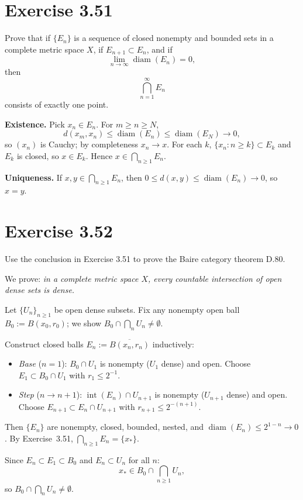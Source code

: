 \documentclass{article}
\begin{document}
\section{Exercise 3.51}

Prove that if $\{E_n\}$ is a sequence of closed nonempty and
bounded sets in a complete metric space $X$, if
$E_{n+1} \subset E_n$, and if
\[
	\lim_{n\to\infty} \operatorname{diam}(E_n)=0,
\]
then
\[
	\bigcap_{n=1}^{\infty} E_n
\]
consists of exactly one point.

\begin{solution}
	\textbf{Existence.}\;
	Pick $x_n\in E_n$.  For $m\ge n\ge N$,
	\[
		d(x_m,x_n)\le\operatorname{diam}(E_n)
		\le\operatorname{diam}(E_N)\to0,
	\]
	so $(x_n)$ is Cauchy; by completeness $x_n\to x$.
	For each $k$, $\{x_n:n\ge k\}\subset E_k$ and $E_k$ is closed,
	so $x\in E_k$.  Hence $x\in\bigcap_{n\ge1}E_n$.

	\medskip

	\textbf{Uniqueness.}\;
	If $x,y\in\bigcap_{n\ge1}E_n$, then
	$0\le d(x,y)\le\operatorname{diam}(E_n)\to0$,
	so $x=y$.\qedhere
\end{solution}

\section{Exercise 3.52}

Use the conclusion in Exercise 3.51 to prove the Baire
category theorem D.80.

\begin{solution}
	We prove: \emph{in a complete metric space $X$, every countable
	intersection of open dense sets is dense.}

	Let $\{U_n\}_{n\ge1}$ be open dense subsets.
	Fix any nonempty open ball $B_0:=B(x_0,r_0)$;
	we show $B_0\cap\bigcap_n U_n\neq\emptyset$.

	Construct closed balls $E_n:=\overline{B(x_n,r_n)}$
	inductively:
	\begin{itemize}\setlength\itemsep{2pt}
		\item \emph{Base} ($n=1$):\;
		$B_0\cap U_1$ is nonempty ($U_1$ dense) and open.
		Choose $E_1\subset B_0\cap U_1$ with $r_1\le2^{-1}$.
		\item \emph{Step} ($n\to n{+}1$):\;
		$\operatorname{int}(E_n)\cap U_{n+1}$ is nonempty
		($U_{n+1}$ dense) and open.
		Choose $E_{n+1}\subset E_n\cap U_{n+1}$
		with $r_{n+1}\le2^{-(n+1)}$.
	\end{itemize}
	Then $\{E_n\}$ are nonempty, closed, bounded, nested,
	and $\operatorname{diam}(E_n)\le2^{1-n}\to0$.
	By Exercise~3.51, $\bigcap_{n\ge1}E_n=\{x_*\}$.

	Since $E_n\subset E_1\subset B_0$ and $E_n\subset U_n$
	for all $n$:
	\[
		x_*\in B_0\cap\bigcap_{n\ge1}U_n,
	\]
	so $B_0\cap\bigcap_n U_n\neq\emptyset$.
\end{solution}
\end{document}
